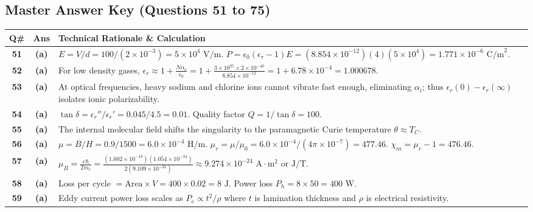 \newpage

\subsection*{Master Answer Key (Questions 51 to 75)}

{\small
\noindent\begin{tabularx}{\textwidth}{|c|c|X|}
\hline
\textbf{Q\#} & \textbf{Ans} & \textbf{Technical Rationale \& Calculation} \\
\hline
\textbf{51} & \textbf{(a)} & $E = V/d = 100 / (2 \times 10^{-3}) = 5 \times 10^4\text{ V/m}$. $P = \epsilon_0(\epsilon_r - 1)E = (8.854 \times 10^{-12})(4)(5 \times 10^4) = 1.771 \times 10^{-6}\text{ C/m}^2$. \\ \hline
\textbf{52} & \textbf{(a)} & For low density gases, $\epsilon_r \approx 1 + \frac{N\alpha_e}{\epsilon_0} = 1 + \frac{3 \times 10^{25} \times 2 \times 10^{-40}}{8.854 \times 10^{-12}} = 1 + 6.78 \times 10^{-4} = 1.000678$. \\ \hline
\textbf{53} & \textbf{(a)} & At optical frequencies, heavy sodium and chlorine ions cannot vibrate fast enough, eliminating $\alpha_i$; thus $\epsilon_r(0) - \epsilon_r(\infty)$ isolates ionic polarizability. \\ \hline
\textbf{54} & \textbf{(a)} & $\tan \delta = \epsilon_r'' / \epsilon_r' = 0.045 / 4.5 = 0.01$. Quality factor $Q = 1 / \tan \delta = 100$. \\ \hline
\textbf{55} & \textbf{(a)} & The internal molecular field shifts the singularity to the paramagnetic Curie temperature $\theta \approx T_C$. \\ \hline
\textbf{56} & \textbf{(a)} & $\mu = B/H = 0.9 / 1500 = 6.0 \times 10^{-4}\text{ H/m}$. $\mu_r = \mu / \mu_0 = 6.0 \times 10^{-4} / (4\pi \times 10^{-7}) = 477.46$. $\chi_m = \mu_r - 1 = 476.46$. \\ \hline
\textbf{57} & \textbf{(a)} & $\mu_B = \frac{e\hbar}{2m_e} = \frac{(1.602 \times 10^{-19})(1.054 \times 10^{-34})}{2(9.109 \times 10^{-31})} \approx 9.274 \times 10^{-24}\text{ A}\cdot\text{m}^2\text{ or J/T}$. \\ \hline
\textbf{58} & \textbf{(a)} & Loss per cycle $= \text{Area} \times V = 400 \times 0.02 = 8\text{ J}$. Power loss $P_h = 8 \times 50 = 400\text{ W}$. \\ \hline
\textbf{59} & \textbf{(a)} & Eddy current power loss scales as $P_e \propto t^2 / \rho$ where $t$ is lamination thickness and $\rho$ is electrical resistivity. \\ \hline

\end{tabularx}}
